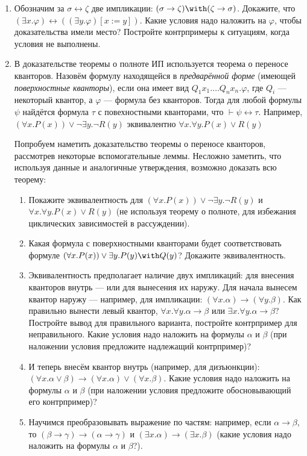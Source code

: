 \documentclass[10pt,a4paper,oneside]{article}
\begin{document}
\begin{enumerate}
\item Обозначим за $\sigma\leftrightarrow\zeta$ две импликации: $(\sigma\rightarrow\zeta)\with(\zeta\rightarrow\sigma)$.
Докажите, что $(\exists x.\varphi) \leftrightarrow ((\exists y.\varphi)[x := y])$. Какие условия надо наложить на $\varphi$, чтобы доказательства имели место?
Постройте контрпримеры к ситуациям, когда условия не выполнены.
\item В доказательстве теоремы о полноте ИП используется теорема о переносе кванторов.
Назовём формулу находящейся в \emph{предварённой форме} (имеющей \emph{поверхностные кванторы}), если
она имеет вид $Q_1 x_1.\dots Q_n x_n.\varphi$, где $Q_i$ --- некоторый квантор, а $\varphi$ --- формула без кванторов.
Тогда для любой формулы $\psi$ найдётся формула $\tau$ с повехностными кванторами, что $\vdash \psi\leftrightarrow\tau$.
Например, $(\forall x.P(x)) \vee \neg\exists y.\neg R(y)$ эквивалентно $\forall x.\forall y.P(x)\vee R(y)$

Попробуем наметить доказательство теоремы о переносе кванторов, рассмотрев некоторые вспомогательные
леммы. Несложно заметить, что используя данные и аналогичные утверждения, возможно доказать всю теорему:
\begin{enumerate}
\item Покажите эквивалентность для $(\forall x.P(x)) \vee \neg\exists y.\neg R(y)$ и $\forall x.\forall y.P(x)\vee R(y)$
(не используя теорему о полноте, для избежания циклических зависимостей в рассуждении).
\item Какая формула с поверхностными кванторами будет соответствовать формуле $(\forall x.P(x)) \vee \exists y.P(y) \with Q(y)$?
Докажите эквивалентность.
\item Эквивалентность предполагает наличие двух импликаций: для внесения кванторов внутрь --- или для вынесения их наружу.
Для начала вынесем квантор наружу --- например, для импликации: $(\forall x.\alpha)\rightarrow(\forall y.\beta)$. Как правильно вынести левый квантор, 
$\forall x.\forall y.\alpha\rightarrow\beta$ или $\exists x.\forall y.\alpha\rightarrow\beta$? Постройте вывод для правильного варианта, постройте контрпример для неправильного.
Какие условия надо наложить на формулы $\alpha$ и $\beta$
(при наложении условия предложите надлежащий контрпример)?
\item И теперь внесём квантор внутрь (например, для дизъюнкции):
$(\forall x.\alpha\vee\beta) \rightarrow (\forall x.\alpha)\vee(\forall x.\beta)$. 
Какие условия надо наложить на формулы $\alpha$ и $\beta$ (при наложении условия предложите обосновывающий его контрпример)?
\item Научимся преобразовывать выражение по частям: например, если $\alpha\rightarrow\beta$, 
то $(\beta\rightarrow\gamma) \rightarrow (\alpha\rightarrow\gamma)$ и $(\exists x.\alpha) \rightarrow (\exists x.\beta)$ 
(какие условия надо наложить на формулы $\alpha$ и $\beta$?).
\end{enumerate}
\end{enumerate}
\end{document}
